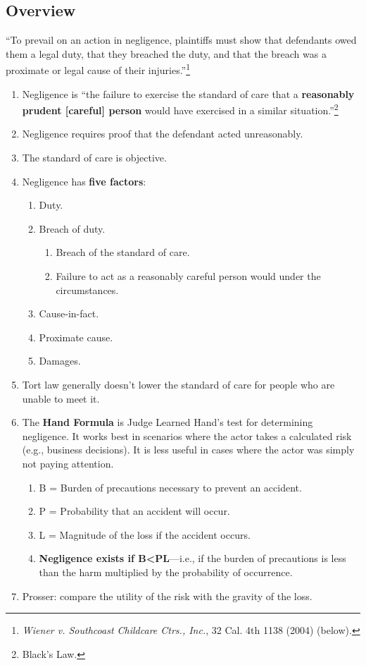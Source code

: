 \subsection{Overview}

``To prevail on an action in negligence, plaintiffs must show that defendants 
owed them a legal duty, that they breached the duty, and that the breach was a 
proximate or legal cause of their injuries.''\footnote{\emph{Wiener v. 
Southcoast Childcare Ctrs., Inc.}, 32 Cal. 4th 1138 (2004) (below).}

\begin{enumerate}
    \item Negligence is ``the failure to exercise the standard of care that a 
    \textbf{reasonably prudent [careful] person} would have exercised in a 
    similar situation.''\footnote{Black's Law.}
    \item Negligence requires proof that the defendant acted unreasonably.
    \item The standard of care is objective.
    \item Negligence has \textbf{five factors}:
    \begin{enumerate}
        \item Duty.
        \item Breach of duty.
        \begin{enumerate}
            \item Breach of the standard of care.
            \item Failure to act as a reasonably careful person would under 
            the circumstances.
        \end{enumerate}
        \item Cause-in-fact.
        \item Proximate cause.
        \item Damages.
    \end{enumerate}
    \item Tort law generally doesn't lower the standard of care for people who 
    are unable to meet it.
    \item The \textbf{Hand Formula} is Judge Learned Hand's test for determining 
    negligence. It works best in scenarios where the actor takes a calculated 
    risk (e.g., business decisions). It is less useful in cases where the 
    actor was simply not paying attention.
    \begin{enumerate}
        \item B = Burden of precautions necessary to prevent an accident.
        \item P = Probability that an accident will occur.
        \item L = Magnitude of the loss if the accident occurs.
        \item \textbf{Negligence exists if B\textless PL}---i.e., if the burden of 
        precautions is less than the harm multiplied by the probability of 
        occurrence.
    \end{enumerate}
    \item Prosser: compare the utility of the risk with the gravity of the 
    loss.
\end{enumerate}

